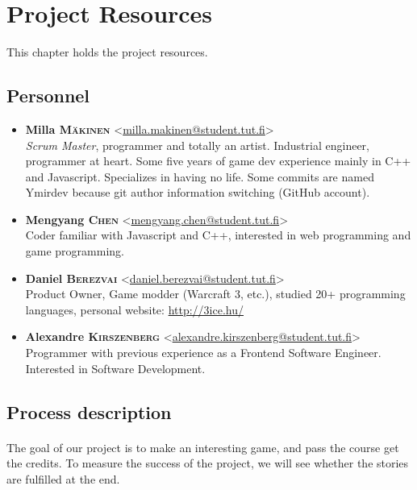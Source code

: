 \section{Project Resources}

This chapter holds the project resources.

\subsection{Personnel}

\begin{itemize}
  \item \textbf{Milla \textsc{Mäkinen}} <\href{mailto:milla.makinen@student.tut.fi}{milla.makinen@student.tut.fi}> \\
        \emph{Scrum Master}, programmer and totally an artist. Industrial engineer, programmer at heart. Some five years of game dev experience mainly in C++ and Javascript. Specializes in having no life. Some commits are named Ymirdev because git author information switching (GitHub account).
  \item \textbf{Mengyang \textsc{Chen}} <\href{mailto:mengyang.chen@student.tut.fi}{mengyang.chen@student.tut.fi}> \\
        Coder familiar with Javascript and C++, interested in web programming and game programming.
  \item \textbf{Daniel \textsc{Berezvai}} <\href{mailto:daniel.berezvai@student.tut.fi}{daniel.berezvai@student.tut.fi}> \\
        Product Owner, Game modder (Warcraft 3, etc.), studied 20+ programming languages, personal website: \href{http://3ice.hu/}{http://3ice.hu/}
  \item \textbf{Alexandre \textsc{Kirszenberg}} <\href{mailto:alexandre.kirszenberg@student.tut.fi}{alexandre.kirszenberg@student.tut.fi}>
        Programmer with previous experience as a Frontend Software Engineer. Interested in Software Development.
\end{itemize}

\subsection{Process description}

\paragraph{} The goal of our project is to make an interesting game, and pass the  course get the credits. To measure the success of the project, we will see whether the stories are fulfilled at the end.

